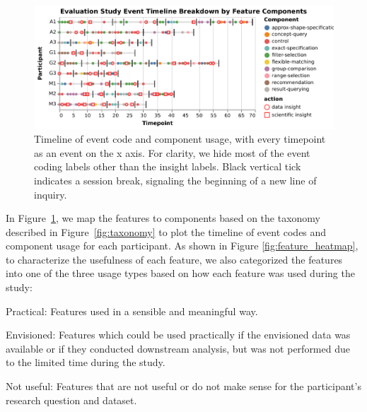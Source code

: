 \begin{figure}[h!]
  \includegraphics[width=\linewidth]{figures/evalstudytimeline.pdf}
  \caption{Timeline of event code and component usage, with every timepoint as an event on the x axis. For clarity, we hide most of the event coding labels other than the insight labels. Black vertical tick indicates a session break, signaling the beginning of a new line of inquiry.}\label{fig:evalstudytimeline}
\end{figure}
In Figure~\ref{fig:evalstudytimeline}, we map the features to components based on the taxonomy described in Figure~\ref{fig:taxonomy} to plot the timeline of event codes and component usage for each participant. As shown in Figure \ref{fig:feature_heatmap}, to characterize the usefulness of each feature, we also categorized the features into one of the three usage types based on how each feature was used during the study:
\begin{denselist}
    \item Practical: Features used in a sensible and meaningful way.
    \item Envisioned: Features which could be used practically if the envisioned data was available or if they conducted downstream analysis, but was not performed due to the limited time during the study.
    \item Not useful: Features that are not useful or do not make sense for the participant's research question and dataset.
\end{denselist}
